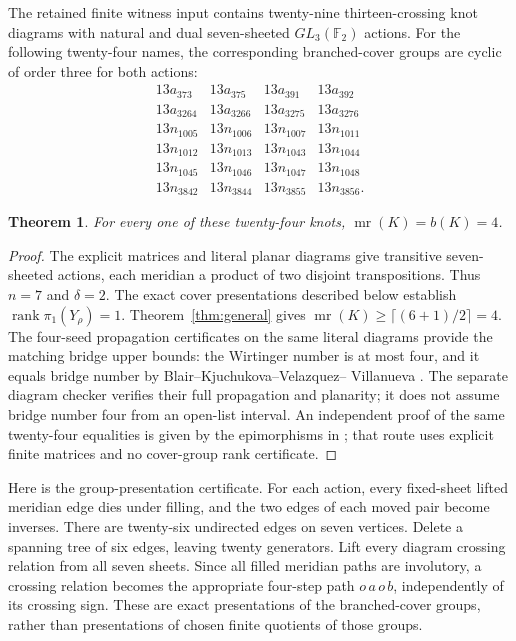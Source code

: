\documentclass[11pt]{article}
\newtheorem{theorem}{Theorem}
\newcommand{\mr}{\operatorname{mr}}
\newcommand{\rank}{\operatorname{rank}}
\newcommand{\F}{\mathbb F}
\begin{document}
The retained finite witness input contains twenty-nine thirteen-crossing
knot diagrams with natural and dual seven-sheeted $GL_3(\F_2)$ actions.
For the following twenty-four names, the corresponding branched-cover
groups are cyclic of order three for both actions:
\[
\begin{array}{rrrr}
13a_{373}&13a_{375}&13a_{391}&13a_{392}\\
13a_{3264}&13a_{3266}&13a_{3275}&13a_{3276}\\
13n_{1005}&13n_{1006}&13n_{1007}&13n_{1011}\\
13n_{1012}&13n_{1013}&13n_{1043}&13n_{1044}\\
13n_{1045}&13n_{1046}&13n_{1047}&13n_{1048}\\
13n_{3842}&13n_{3844}&13n_{3855}&13n_{3856}.
\end{array}
\]

\begin{theorem}\label{thm:twentyfour}
For every one of these twenty-four knots, $\mr(K)=b(K)=4$.
\end{theorem}
\begin{proof}
The explicit matrices and literal planar diagrams give transitive
seven-sheeted actions, each meridian a product of two disjoint
transpositions. Thus $n=7$ and $\delta=2$.
The exact cover presentations described below establish
$\rank\pi_1(Y_\rho)=1$. Theorem~\ref{thm:general} gives
$\mr(K)\ge\lceil(6+1)/2\rceil=4$.
The four-seed propagation certificates on the same literal diagrams
provide the matching bridge upper bounds: the Wirtinger number is at
most four, and it equals bridge number by Blair--Kjuchukova--Velazquez--
Villanueva \cite[Theorem 1.3]{wirt}. The separate diagram
checker verifies their full propagation and planarity; it does not
assume bridge number four from an open-list interval.
An independent proof of the same twenty-four equalities is given by
the epimorphisms in ; that route
uses explicit finite matrices and no cover-group rank certificate.
\end{proof}

Here is the group-presentation certificate. For each action, every
fixed-sheet lifted meridian edge dies under filling, and the two edges
of each moved pair become inverses. There are twenty-six undirected
edges on seven vertices. Delete a spanning tree of six edges, leaving
twenty generators. Lift every diagram crossing relation from all seven
sheets. Since all filled meridian paths are involutory, a crossing
relation becomes the appropriate four-step path $o\,a\,o\,b$,
independently of its crossing sign. These are exact presentations of
the branched-cover groups, rather than presentations of chosen finite
quotients of those groups.
\end{document}

